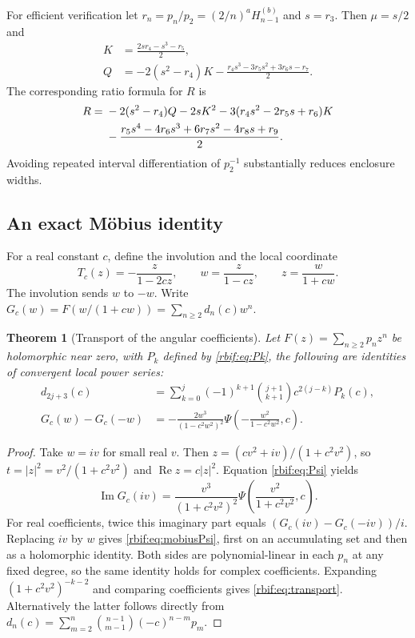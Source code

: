 \documentclass[11pt,a4paper]{article}
\newtheorem{theorem}{Theorem}[section]
\theoremstyle{definition}\newtheorem{definition}[theorem]{Definition}
\theoremstyle{remark}\newtheorem{remark}[theorem]{Remark}
\newcommand{\rbIm}{\operatorname{Im}}
\newcommand{\rbRe}{\operatorname{Re}}
\numberwithin{equation}{section}
\begin{document}
For efficient verification let $r_n=p_n/p_2=(2/n)^aH_{n-1}^{(b)}$ and
$s=r_3$. Then $\mu=s/2$ and
\begin{align}
 K&=\frac{2sr_4-s^3-r_5}{2},\label{rbif:eq:ratioK}\\
 Q&=-2(s^2-r_4)K
       -\frac{r_4s^3-3r_5s^2+3r_6s-r_7}{2}.\label{rbif:eq:ratioQ}
\end{align}
The corresponding ratio formula for $R$ is
\begin{align}
 R={}&-2(s^2-r_4)Q-2sK^2
       -3(r_4s^2-2r_5s+r_6)K\notag\\
 &-\frac{r_5s^4-4r_6s^3+6r_7s^2-4r_8s+r_9}{2}.
 \label{rbif:eq:ratioR}
\end{align}
Avoiding repeated interval differentiation of $p_2^{-1}$ substantially
reduces enclosure widths.

\subsection{An exact M\"obius identity}
For a real constant $c$, define the involution and the local coordinate
\begin{equation}
 T_c(z)=-\frac{z}{1-2cz},\qquad
 w=\frac{z}{1-cz},\qquad z=\frac{w}{1+cw}.
 \label{rbif:eq:mobius}
\end{equation}
The involution sends $w$ to $-w$. Write
$G_c(w)=F(w/(1+cw))=\sum_{n\ge2}d_n(c)w^n$.

\begin{theorem}[Transport of the angular coefficients]
\label{rbif:thm:transport}
Let $F(z)=\sum_{n\ge2}p_nz^n$ be holomorphic near zero, with $P_k$ defined by
\eqref{rbif:eq:Pk}, the following are identities of convergent local
power series:
\begin{align}
 d_{2j+3}(c)
   &=\sum_{k=0}^j(-1)^{k+1}\binom{j+1}{k+1}
                      c^{2(j-k)}P_k(c),\label{rbif:eq:transport}\\
 G_c(w)-G_c(-w)
   &=-\frac{2w^3}{(1-c^2w^2)^2}
      \Psi\!\left(-\frac{w^2}{1-c^2w^2},c\right).
 \label{rbif:eq:mobiusPsi}
\end{align}
\end{theorem}
\begin{proof}
Take $w=iv$ for small real $v$. Then
$z=(cv^2+iv)/(1+c^2v^2)$, so
$t=|z|^2=v^2/(1+c^2v^2)$ and $\rbRe z=c|z|^2$.
Equation \eqref{rbif:eq:Psi} yields
\[
 \rbIm G_c(iv)=\frac{v^3}{(1+c^2v^2)^2}
        \Psi\!\left(\frac{v^2}{1+c^2v^2},c\right).
\]
For real coefficients, twice this imaginary part equals
$(G_c(iv)-G_c(-iv))/i$. Replacing $iv$ by $w$ gives
\eqref{rbif:eq:mobiusPsi}, first on an accumulating set and then as a
holomorphic identity. Both sides are polynomial-linear in each $p_n$
at any fixed degree, so the same identity holds for complex coefficients.
Expanding $(1+c^2v^2)^{-k-2}$ and comparing coefficients gives
\eqref{rbif:eq:transport}. Alternatively the latter follows directly
from
$d_n(c)=\sum_{m=2}^n\binom{n-1}{m-1}(-c)^{n-m}p_m$.
\end{proof}
\end{document}
